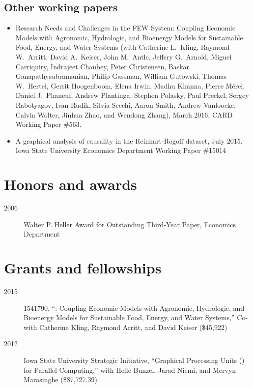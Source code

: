 \documentclass[12pt]{article}%
\newcommand{\allcaps}[1]{\textls{\MakeUppercase{#1}}}
\begin{document}
\subsection*{Other working papers}
\begin{itemize}
\item Research Needs and Challenges in the FEW System: Coupling
  Economic Models with Agronomic, Hydrologic, and Bioenergy Models for
  Sustainable Food, Energy, and Water Systems (with Catherine L.\
  Kling, Raymond W.\ Arritt, David A.\ Keiser, John M.\
  Antle, Jeffery G.\ Arnold, Miguel Carriquiry, Indrajeet Chaubey,
  Peter Christensen, Baskar Ganapathysubramanian, Philip Gassman,
  William Gutowski, Thomas W.\ Hertel, Gerrit Hoogenboom, Elena Irwin,
  Madhu Khanna, Pierre M\'erel, Daniel J.\ Phaneuf, Andrew Plantinga,
  Stephen Polasky, Paul Preckel, Sergey Rabotyagov, Ivan Rudik, Silvia
  Secchi, Aaron Smith, Andrew Vanloocke, Calvin Wolter, Jinhua Zhao,
  and Wendong Zhang), March 2016. CARD Working Paper \#563.

\item A graphical analysis of causality in the Reinhart-Rogoff
  dataset, July 2015. Iowa State University Economics Department
  Working Paper \#15014
\end{itemize}

\section*{Honors and awards}

\begin{description}
\item[2006] Walter P. Heller Award for Outstanding Third-Year Paper,
\allcaps{UCSD} Economics Department
\end{description}

\section*{Grants and fellowships}

\begin{description}
\item[2015] \allcaps{NSF} 1541790, ``\allcaps{FEW}: Coupling
  Economic Models with Agronomic, Hydrologic, and Bioenergy Models for
  Sustainable Food, Energy, and Water Systems,'' Co-\allcaps{PI} with
  Catherine Kling, Raymond Arritt, and David Keiser (\$45,922)
\item[2012] Iowa State University Strategic Initiative, ``Graphical
  Processing Units (\allcaps{GPU}) for Parallel Computing,'' with
  Helle Bunzel, Jarad Niemi, and Mervyn Marasinghe (\$87,727.39)
\end{description}
\end{document}
